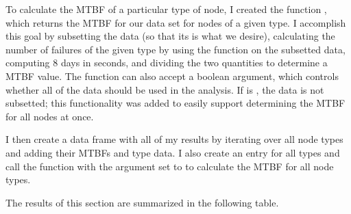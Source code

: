 To calculate the MTBF of a particular type of node, I created the function , which returns the MTBF for our data set for nodes of a given type.  I accomplish this goal by subsetting the data (so that its  is what we desire), calculating the number of failures of the given type by using the  function on the subsetted data, computing 8 days in seconds, and dividing the two quantities to determine a MTBF value.  The function can also accept a boolean  argument, which controls whether all of the data should be used in the analysis.  If  is , the data is not subsetted; this functionality was added to easily support determining the MTBF for all nodes at once.

I then create a data frame with all of my results by iterating over all node types and adding their MTBFs and type data.  I also create an entry for all types and call the  function with the  argument set to  to calculate the MTBF for all node types.

The results of this section are summarized in the following table.
